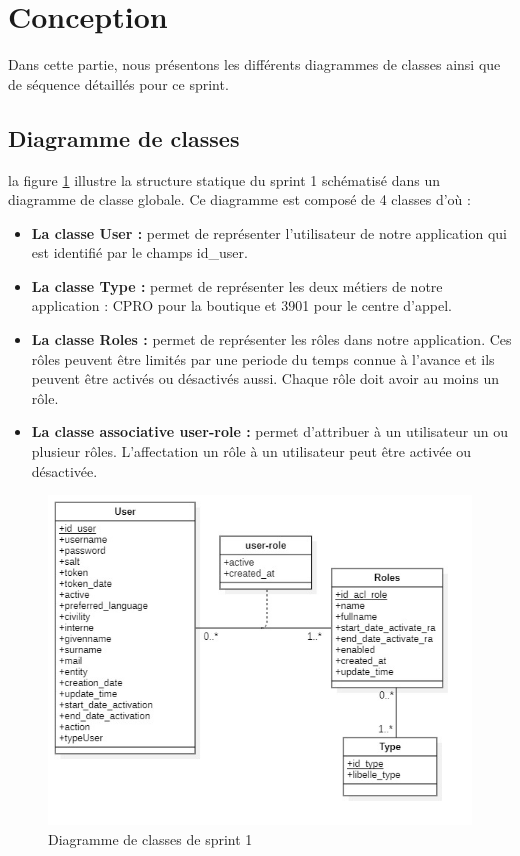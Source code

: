 \section{Conception}
Dans cette partie, nous présentons les différents diagrammes de classes ainsi que de séquence détaillés pour ce sprint.
\subsection{Diagramme de classes}
la figure \ref{fig:classdiag-sprint1} illustre la structure statique du sprint 1 schématisé dans un diagramme de classe globale. Ce diagramme est composé de 4 classes d'où :
\begin{itemize}
	\item \textbf{La classe User :} permet de représenter l'utilisateur de notre application qui est identifié par le champs id\_user.
	\item \textbf{La classe Type :} permet de représenter les deux métiers de notre application : CPRO pour la boutique et 3901 pour le centre d'appel.
	\item \textbf{La classe Roles :} permet de représenter les rôles dans notre application. Ces rôles peuvent être limités par une periode du temps connue à l'avance et ils peuvent être activés ou désactivés aussi. Chaque rôle doit avoir au moins un rôle.
	\item \textbf{La classe associative user-role :} permet d'attribuer à un utilisateur un ou plusieur rôles. L'affectation un rôle à un utilisateur peut être activée ou désactivée.
\end{itemize}
\begin{figure}[H]
	\centering
	\includegraphics[width=0.7\linewidth]{img/conception/classes/ClassDiag-sprint1}
	\caption[Diagramme de classes de sprint 1]{Diagramme de classes de sprint 1}
	\label{fig:classdiag-sprint1}
\end{figure}
